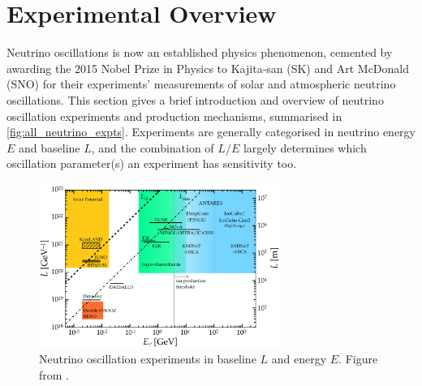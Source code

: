 \section{Experimental Overview}
\label{sec:exp_overview}
Neutrino oscillations is now an established physics phenomenon, cemented by awarding the 2015 Nobel Prize in Physics to Kajita-san (SK) and Art McDonald (SNO) for their experiments' measurements of solar and atmospheric neutrino oscillations. This section gives a brief introduction and overview of neutrino oscillation experiments and production mechanisms, summarised in \autoref{fig:all_neutrino_expts}. Experiments are generally categorised in neutrino energy $E$ and baseline $L$, and the combination of $L/E$ largely determines which oscillation parameter(s) an experiment has sensitivity too.
\begin{figure}[h]
	\includegraphics[width=0.7\textwidth, trim={0mm 0mm 0mm 0mm}, clip,page=1]{figures/theory/le_experiments}
	\caption{Neutrino oscillation experiments in baseline $L$ and energy $E$. Figure from \cite{ic_neutrino_2018}.}
	\label{fig:all_neutrino_expts}
\end{figure}

